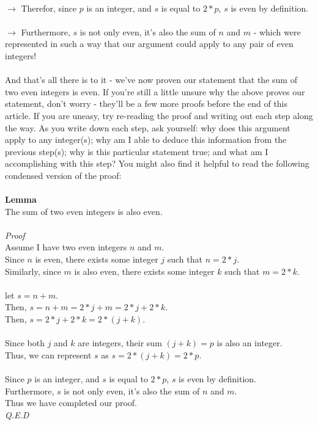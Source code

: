 \documentclass[a4paper,12pt]{article}
\begin{document}
\\
$\rightarrow$ Therefor, since $p$ is an integer, and $s$ is equal to $2*p$, $s$ is even by definition.\\ 
\\
$\rightarrow$ Furthermore, $s$ is not only even, it's also the sum of $n$ and $m$ - which were represented in such a way that our argument could apply to any pair of even integers! \\
\\
And that's all there is to it - we've now proven our statement that the sum of two even integers is even. If you're still a little unsure why the above proves our statement, don't worry - they'll be a few more proofs before the end of this article. If you are uneasy, try re-reading the proof and writing out each step along the way. As you write down each step, ask yourself: why does this argument apply to any integer(s); why am I able to deduce this information from the previous step(s); why is this particular statement true; and what am I accomplishing with this step? You might also find it helpful to read the following condensed version of the proof:\\
\\
\textbf{Lemma}\\
The sum of two even integers is also even.\\
\\
\textit{Proof}\\
Assume I have two even integers $n$ and $m$. \\
Since $n$ is even, there exists some integer $j$ such that $n = 2*j$. \\
Similarly, since $m$ is also even, there exists some integer $k$ such that $m = 2*k$. \\
\\
let $s = n + m$.\\
Then, $s = n + m = 2*j + m = 2*j + 2*k$.\\
Then, $s = 2*j + 2*k = 2*(j + k)$. \\
\\
Since both $j$ and $k$ are integers, their sum $(j + k) = p$ is also an integer.\\
Thus, we can represent $s$ as $s = 2*(j + k) = 2*p$.\\ 
\\
Since $p$ is an integer, and $s$ is equal to $2*p$, $s$ is even by definition.\\ 
Furthermore, $s$ is not only even, it's also the sum of $n$ and $m$.\\
Thus we have completed our proof.\\
\textit{Q.E.D}
\end{document}
